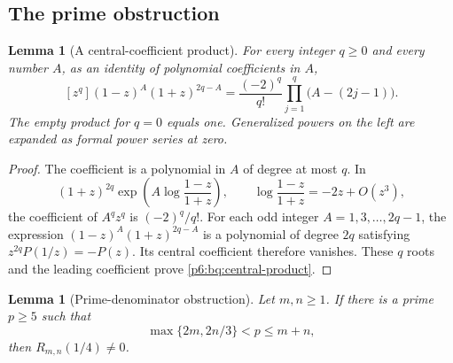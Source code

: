 \documentclass[11pt,a4paper]{article}
\newtheorem{lemma}[theorem]{Lemma}
\theoremstyle{definition}
\theoremstyle{remark}
\numberwithin{equation}{section}
\begin{document}
\subsection{The prime obstruction}

\begin{lemma}[A central-coefficient product]\label{p6:bq:central}
For every integer $q\ge0$ and every number $A$,
as an identity of polynomial coefficients in $A$,
\begin{equation}\label{p6:bq:central-product}
 [z^q](1-z)^A(1+z)^{2q-A}
   =\frac{(-2)^q}{q!}\prod_{j=1}^q\bigl(A-(2j-1)\bigr).
\end{equation}
The empty product for $q=0$ equals one. Generalized powers
on the left are expanded as formal power series at zero.
\end{lemma}

\begin{proof}
The coefficient is a polynomial in $A$ of degree at most $q$.
In
\[
 (1+z)^{2q}
 \exp\!\left(A\log\frac{1-z}{1+z}\right),
 \qquad \log\frac{1-z}{1+z}=-2z+O(z^3),
\]
the coefficient of $A^qz^q$ is $(-2)^q/q!$.
For each odd integer $A=1,3,\ldots,2q-1$, the expression
$(1-z)^A(1+z)^{2q-A}$ is a polynomial of degree $2q$
satisfying $z^{2q}P(1/z)=-P(z)$. Its central coefficient
therefore vanishes. These $q$ roots and the leading coefficient
prove \eqref{p6:bq:central-product}.
\end{proof}

\begin{lemma}[Prime-denominator obstruction]\label{p6:bq:prime}
Let $m,n\ge1$. If there is a prime $p\ge5$ such that
\begin{equation}\label{p6:bq:prime-range}
 \max\{2m,2n/3\}<p\le m+n,
\end{equation}
then $R_{m,n}(1/4)\ne0$.
\end{lemma}
\end{document}
